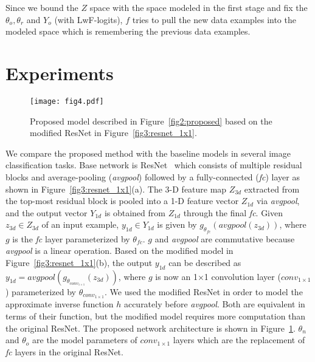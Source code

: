 \documentclass[runningheads,a4paper]{llncs}
\begin{document}
Since we bound the $Z$ space with the space modeled in the first stage and fix the $\theta_o, \theta_r$ and $Y_o$ (with LwF-logits), $f$ tries to pull the new data examples into the modeled space which is remembering the previous data examples.



\section{Experiments}

\begin{figure}[t]
\begin{center}
\texttt{[image: fig4.pdf]}
\caption{Proposed model described in Figure~\ref{fig2:proposed} based on the modified ResNet in Figure~\ref{fig3:resnet_1x1}.}
\label{fig4:modified_resnet}
\end{center}
\end{figure}

We compare the proposed method with the baseline models in several image classification tasks. Base network is ResNet~\cite{r07_resnet_cvpr2016} which consists of multiple residual blocks and average-pooling (\textit{avgpool}) followed by a fully-connected (\textit{fc}) layer as shown in Figure~\ref{fig3:resnet_1x1}(a). The 3-D feature map $Z_{3d}$ extracted from the top-most residual block is pooled into a 1-D feature vector $Z_{1d}$ via \textit{avgpool}, and the output vector $Y_{1d}$ is obtained from $Z_{1d}$ through the final \textit{fc}. Given $z_{3d} \in Z_{3d}$ of an input example, $y_{1d} \in Y_{1d}$ is given by $g_{\theta_{fc}}(avgpool(z_{3d}))$, where $g$ is the \textit{fc} layer parameterized by $\theta_{fc}$. $g$ and \textit{avgpool} are commutative because \textit{avgpool} is a linear operation. Based on the modified model in Figure~\ref{fig3:resnet_1x1}(b), the output $y_{1d}$ can be described as $y_{1d} = avgpool(g_{\theta_{{conv}_{1\times1}}}(z_{3d}))$, where $g$ is now an 1$\times$1 convolution layer ($conv_{1\times1}$) parameterized by $\theta_{{conv}_{1\times1}}$. We used the modified ResNet in order to model the approximate inverse function $h$ accurately before \textit{avgpool}. Both are equivalent in terms of their function, but the modified model requires more computation than the original ResNet. The proposed network architecture is shown in Figure~\ref{fig4:modified_resnet}. $\theta_n$ and $\theta_o$ are the model parameters of $conv_{1\times1}$ layers which are the replacement of \textit{fc} layers in the original ResNet.
\end{document}
